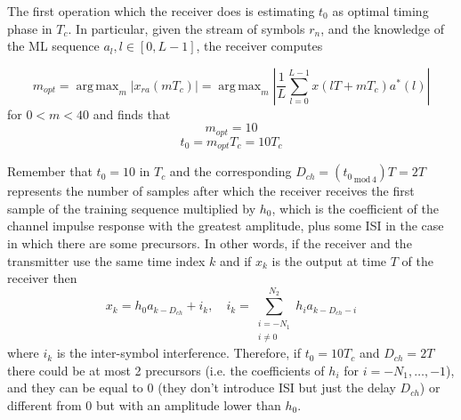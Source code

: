 \documentclass[10pt]{article}
\DeclareMathOperator*{\argmax}{arg\,max}
\newcommand{\lmod}[1] {_{\,\mathrm{mod}\,#1}}
\begin{document}
The first operation which the receiver does is estimating $t_0$ as optimal timing phase in $T_c$. In particular, given the stream of symbols $r_n$, and the knowledge of the ML sequence $a_l, l\in [0, L-1]$, the receiver computes

\begin{equation}
	m_{opt} = \argmax_{m} | x_{ra}(mT_c) | = \argmax_{m} | \frac{1}{L} \sum_{l = 0}^{L - 1} x(lT + mT_c)a^* (l) |
\end{equation}
for $ 0 < m < 40$ and finds that
\begin{equation}
	m_{opt} = 10
\end{equation}
\begin{equation}
	t_{0} = m_{opt}T_c = 10 T_c
\end{equation}

Remember that $t_0 = 10$ in $T_c$ and the corresponding $D_{ch} = ({t_0}\lmod{4})T = 2T$ represents the number of samples after which the receiver receives the first sample of the training sequence multiplied by $h_0$, which is the coefficient of the channel impulse response with the greatest amplitude, plus some ISI in the case in which there are some precursors. In other words, if the receiver and the transmitter use the same time index $k$ and if $x_k$ is the output at time $T$ of the receiver then
\begin{equation}
x_{k} = h_0a_{k-D_{ch}} + i_k, \quad i_k = \sum_{\substack{i = -N_1 \\ i \neq 0}}^{N_2} h_i a_{k-D_{ch}-i}
\end{equation}
where $i_k$ is the inter-symbol interference. Therefore, if $t_0 = 10T_c$ and $D_{ch} = 2T$ there could be at most 2 precursors (i.e. the coefficients of $h_i$ for $i = -N_1, \dots, -1$), and they can be equal to 0 (they don't introduce ISI but just the delay $D_{ch}$) or different from 0 but with an amplitude lower than $h_0$. 
\end{document}
